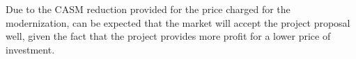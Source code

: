 Due to the CASM reduction provided for the price charged for the modernization, can be expected that the market will accept the project proposal well, given the fact that the project provides more profit for a lower price of investment.
